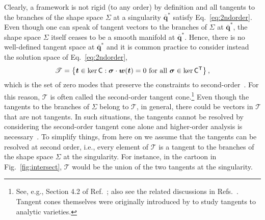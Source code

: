 Clearly, a framework is not rigid (to any order) by definition and all tangents to the branches of the shape space $\Sigma$ at a singularity $\bar{\bm{q}}^{*}$ satisfy Eq.~\eqref{eq:2ndorder}.
Even though one can speak of tangent vectors to the branches of $\Sigma$ at $\bar{\bm{q}}^{*}$, the shape space $\Sigma$ itself ceases to be a smooth manifold at $\bar{\bm{q}}^{*}$.
Hence, there is no well-defined tangent space at $\bar{\bm{q}}^{*}$ and it is common practice to consider instead the solution space of Eq.~\eqref{eq:2ndorder},
%
\begin{equation}
  \mathscr{T} = \left\{\bm{t} \in \ker\mathsf{C} : \bm{\sigma}\cdot \bm{w}(\bm{t}) = 0 \text{ for all } \bm{\sigma} \in \ker\mathsf{C}^\mathsf{T} \right\},
  \label{eq:tangentcone}
\end{equation}
%
which is the set of zero modes that preserve the constraints to second-order~\cite{chen2018}.
For this reason, $\mathscr{T}$ is often called the second-order tangent cone.\footnote{See, e.g., Section 4.2 of Ref.~\cite{wu2020}; also see the related discussions in Refs.~\cite{muller2017,muller2019,lopez-custodio2020}.
Tangent cones themselves were originally introduced by \citet{whitney1965} to study tangents to analytic varieties.}
Even though the tangents to the branches of $\Sigma$ belong to $\mathscr{T}$, in general, there could be vectors in $\mathscr{T}$ that are not tangents.
In such situations, the tangents cannot be resolved by considering the second-order tangent cone alone and higher-order analysis is necessary~\cite{muller2017,lopez-custodio2020}.
To simplify things, from here on we assume that the tangents can be resolved at second order, i.e., every element of $\mathscr{T}$ is a tangent to the branches of the shape space $\Sigma$ at the singularity.
For instance, in the cartoon in Fig.~\ref{fig:intersect}, $\mathscr{T}$ would be the union of the two tangents at the singularity.

